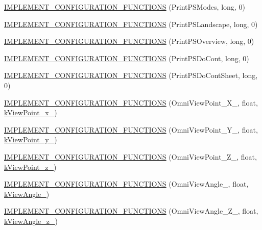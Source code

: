 \begin{DoxyCompactItemize}
\item 
\hyperlink{a00190_a83de6d1a65f65ab50903347a75cc600a}{I\-M\-P\-L\-E\-M\-E\-N\-T\-\_\-\-C\-O\-N\-F\-I\-G\-U\-R\-A\-T\-I\-O\-N\-\_\-\-F\-U\-N\-C\-T\-I\-O\-N\-S} (Print\-P\-S\-Modes, long, 0)
\item 
\hyperlink{a00190_af8c8f368b504c4b07a63a1ba46faf23f}{I\-M\-P\-L\-E\-M\-E\-N\-T\-\_\-\-C\-O\-N\-F\-I\-G\-U\-R\-A\-T\-I\-O\-N\-\_\-\-F\-U\-N\-C\-T\-I\-O\-N\-S} (Print\-P\-S\-Landscape, long, 0)
\item 
\hyperlink{a00190_af1c9d05dc0c74fadd1b46ac4502a0a48}{I\-M\-P\-L\-E\-M\-E\-N\-T\-\_\-\-C\-O\-N\-F\-I\-G\-U\-R\-A\-T\-I\-O\-N\-\_\-\-F\-U\-N\-C\-T\-I\-O\-N\-S} (Print\-P\-S\-Overview, long, 0)
\item 
\hyperlink{a00190_a32a47ba3768359bd005b9f303bc94f62}{I\-M\-P\-L\-E\-M\-E\-N\-T\-\_\-\-C\-O\-N\-F\-I\-G\-U\-R\-A\-T\-I\-O\-N\-\_\-\-F\-U\-N\-C\-T\-I\-O\-N\-S} (Print\-P\-S\-Do\-Cont, long, 0)
\item 
\hyperlink{a00190_a93cc49dab29028a7e6210b84e7012978}{I\-M\-P\-L\-E\-M\-E\-N\-T\-\_\-\-C\-O\-N\-F\-I\-G\-U\-R\-A\-T\-I\-O\-N\-\_\-\-F\-U\-N\-C\-T\-I\-O\-N\-S} (Print\-P\-S\-Do\-Cont\-Sheet, long, 0)
\item 
\hyperlink{a00190_ad298335076c7032b4934db7fd328283e}{I\-M\-P\-L\-E\-M\-E\-N\-T\-\_\-\-C\-O\-N\-F\-I\-G\-U\-R\-A\-T\-I\-O\-N\-\_\-\-F\-U\-N\-C\-T\-I\-O\-N\-S} (Omni\-View\-Point\-\_\-\-X\-\_, float, \hyperlink{a00186_a2af52f51227fade1fa8e6d66aa763eb0}{k\-View\-Point\-\_\-x\-\_})
\item 
\hyperlink{a00190_a76424bc3089193a56d7f8063751a7207}{I\-M\-P\-L\-E\-M\-E\-N\-T\-\_\-\-C\-O\-N\-F\-I\-G\-U\-R\-A\-T\-I\-O\-N\-\_\-\-F\-U\-N\-C\-T\-I\-O\-N\-S} (Omni\-View\-Point\-\_\-\-Y\-\_, float, \hyperlink{a00186_ad7b3835ae2b765cc0a2ae45375185ca3}{k\-View\-Point\-\_\-y\-\_})
\item 
\hyperlink{a00190_a3bcac77e61a12734d5f8347bd76465a3}{I\-M\-P\-L\-E\-M\-E\-N\-T\-\_\-\-C\-O\-N\-F\-I\-G\-U\-R\-A\-T\-I\-O\-N\-\_\-\-F\-U\-N\-C\-T\-I\-O\-N\-S} (Omni\-View\-Point\-\_\-\-Z\-\_, float, \hyperlink{a00186_a2d9e6998200c6314e45cd8f14f852a42}{k\-View\-Point\-\_\-z\-\_})
\item 
\hyperlink{a00190_a00988fe7a314663689daf32f28223170}{I\-M\-P\-L\-E\-M\-E\-N\-T\-\_\-\-C\-O\-N\-F\-I\-G\-U\-R\-A\-T\-I\-O\-N\-\_\-\-F\-U\-N\-C\-T\-I\-O\-N\-S} (Omni\-View\-Angle\-\_, float, \hyperlink{a00186_a116a11673cf1e70127632b771e279d31}{k\-View\-Angle\-\_})
\item 
\hyperlink{a00190_accc5e4777990c6643fd2f11143d4500f}{I\-M\-P\-L\-E\-M\-E\-N\-T\-\_\-\-C\-O\-N\-F\-I\-G\-U\-R\-A\-T\-I\-O\-N\-\_\-\-F\-U\-N\-C\-T\-I\-O\-N\-S} (Omni\-View\-Angle\-\_\-\-Z\-\_, float, \hyperlink{a00186_a867bb7d5df7bc8cff729ce89c7326a22}{k\-View\-Angle\-\_\-z\-\_})

\end{DoxyCompactItemize}
